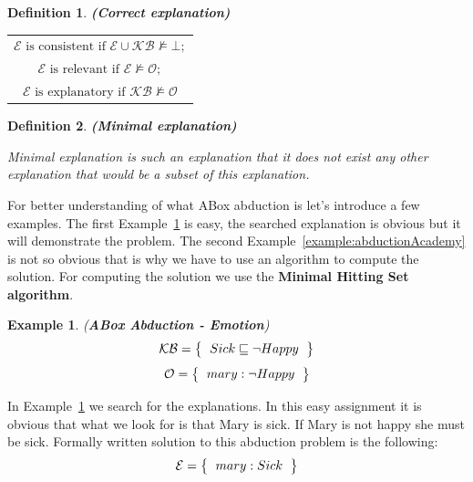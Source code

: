 \documentclass[12pt,a4paper]{article}
\newtheorem{definition}{Definition}[subsection]
\newtheorem{example}{Example}[subsection]
\begin{document}
\newpage
\begin{definition}{\textbf{(Correct explanation)}}
	\begin{table}[H]
		\centering
		\begin{tabular}{c}
			$\mathcal{E} \text{ is consistent if } \mathcal{E} \cup \mathcal{KB} \not \models \mathcal{\bot};$ \\
			\addlinespace[0.4cm]
			$\mathcal{E} \text{ is relevant if } \mathcal{E} \not \models \mathcal{O};$ \\
			\addlinespace[0.4cm]
			$\mathcal{E} \text{ is explanatory if } \mathcal{KB} \not \models \mathcal{O}$ \\
		\end{tabular}
	\end{table}
\end{definition}

\begin{definition}{\textbf{(Minimal explanation)}}
	
	Minimal explanation is such an explanation that it does not exist any other explanation that would be a subset of this explanation.
\end{definition}

For better understanding of what ABox abduction is let's introduce a few examples. The first Example~\ref{example:abductionEmotion} is easy, the searched explanation is obvious but it will demonstrate the problem. The second Example~\ref{example:abductionAcademy} is not so obvious that is why we have to use an algorithm to compute the solution. For computing the solution we use the \textbf{Minimal Hitting Set algorithm}.

\begin{example}{(\textbf{ABox Abduction - Emotion})}
	\label{example:abductionEmotion}
	\[ 
	\mathcal{KB} = \left\{
	\begin{tabular}{c c}
	$Sick \sqsubseteq \neg Happy$
	\end{tabular}
	\right \}
	\]
	\[ 
	\mathcal{O} = \left\{
	\begin{tabular}{c c}
	$mary : \neg Happy$
	\end{tabular}
	\right \}
	\]								
\end{example}

In Example~\ref{example:abductionEmotion} we search for the explanations. In this easy assignment it is obvious that what we look for is that Mary is sick. If Mary is not happy she must be sick. Formally written solution to this abduction problem is the following:
\[ 
\mathcal{E} = \left\{
\begin{tabular}{c c}
$mary : Sick$
\end{tabular}
\right \}
\]
\end{document}
